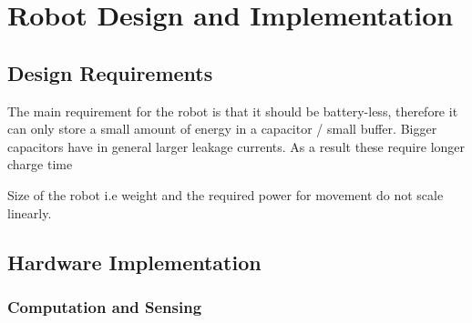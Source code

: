 \chapter{Robot Design and Implementation}


\section{Design Requirements}



The main requirement for the robot is  that it should be battery-less, therefore it can only store a small amount of energy in a capacitor / small buffer.
Bigger capacitors have in general larger leakage currents.
As a result these require longer charge time

Size of the robot i.e weight and the required power for movement do not scale linearly.




	
\section{Hardware Implementation}

 

\subsection{Computation and Sensing}

